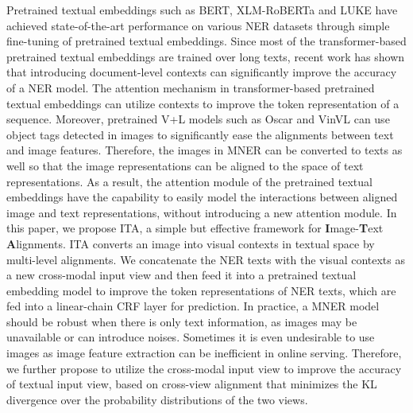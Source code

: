 \documentclass[11pt]{article}
\begin{document}
Pretrained textual embeddings such as BERT, XLM-RoBERTa \citep{conneau-etal-2020-unsupervised} and LUKE \citep{yamada-etal-2020-luke} have achieved state-of-the-art performance on various NER datasets through simple fine-tuning of pretrained textual embeddings. Since most of the transformer-based pretrained textual embeddings are trained over long texts, recent work \citep{akbik-etal-2019-pooled,schweter2020flert,yamada-etal-2020-luke,wang-etal-2021-improving} has shown that introducing document-level contexts can significantly improve the accuracy of a NER model. The attention mechanism in transformer-based pretrained textual embeddings can utilize contexts to improve the token representation of a sequence. Moreover, pretrained V+L models such as Oscar and VinVL \citep{zhang2021vinvl} can use object tags detected in images to significantly ease the alignments between text and image features. Therefore, the images in MNER can be converted to texts as well so that the image representations can be aligned to the space of text representations. As a result, the attention module of the pretrained textual embeddings have the capability to easily model the interactions between aligned image and text representations, without introducing a new attention module. In this paper, we propose ITA, a simple but effective framework for {\bf I}mage-{\bf T}ext {\bf A}lignments. ITA converts an image into visual contexts in textual space by multi-level alignments. We concatenate the NER texts with the visual contexts as a new cross-modal input view and then feed it into a pretrained textual embedding model to improve the token representations of NER texts, which are fed into a linear-chain CRF \citep{10.5555/645530.655813} layer for prediction.
In practice, a MNER model should be robust when there is only text information, as images may be unavailable or can introduce noises. Sometimes it is even undesirable to use images as image feature extraction can be inefficient in online serving. Therefore, we further propose to utilize the cross-modal input view to improve the accuracy of textual input view, based on cross-view alignment that minimizes the KL divergence over the probability distributions of the two views. 
\end{document}
